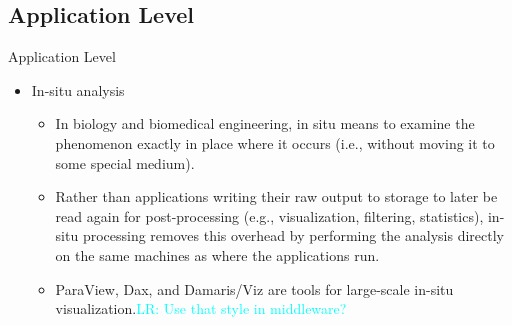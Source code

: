 \documentclass[compress,11pt,xcolor=svgnames,aspectratio=169]{beamer}
\newcommand{\lr}[1]{\textcolor{cyan}{LR: #1}}
\begin{document}
\subsection{Application Level}

\begin{frame}[fragile]{Application Level}

\begin{itemize}

\item In-situ analysis\\[0.4cm]

    \begin{itemize}
    \setlength\itemsep{0.6cm}

    \item In biology and biomedical engineering, in situ means to examine the phenomenon exactly in place where it occurs (i.e., without moving it to some special medium).

    \item Rather than applications writing their raw output to storage to later be read again for post-processing (e.g., visualization, filtering, statistics), in-situ processing removes this overhead by performing the analysis directly on the same machines as where the applications run.

    \item ParaView, Dax, and Damaris/Viz are tools for large-scale in-situ visualization.\lr{Use that style in middleware?}

    \end{itemize}

\end{itemize}

\nocite{3372390}

\end{frame}
\end{document}
